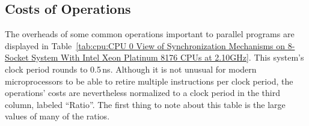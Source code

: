 \subsection{Costs of Operations}
\label{sec:cpu:Costs of Operations}

\begin{table*}
\renewcommand*{\arraystretch}{1.1}
\centering\small
{}
\caption{CPU 0 View of Synchronization Mechanisms on 8-Socket System With Intel Xeon Platinum 8176 CPUs @ 2.10\,GHz}
\label{tab:cpu:CPU 0 View of Synchronization Mechanisms on 8-Socket System With Intel Xeon Platinum 8176 CPUs at 2.10GHz}
\end{table*}

The overheads of some common operations important to parallel programs are
displayed in
Table~\ref{tab:cpu:CPU 0 View of Synchronization Mechanisms on 8-Socket System With Intel Xeon Platinum 8176 CPUs at 2.10GHz}.
This system's clock period rounds to 0.5\,ns.
Although it is not unusual for modern microprocessors to be able to
retire multiple instructions per clock period, the operations' costs are
nevertheless normalized to a clock period in the third column, labeled
``Ratio''.
The first thing to note about this table is the large values of many of
the ratios.

